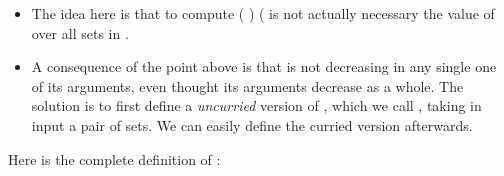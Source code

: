 \begin{itemize}
  \item The idea here is that to compute   (  ) (   is not actually necessary the value of  over all sets in .
  
  \TODO{}

  
  \item A consequence of the point above is that  is not decreasing in any single one of its arguments, even thought its arguments decrease as a whole. The solution is to first define a \emph{uncurried} version of , which we call , taking in input a pair of sets. We can easily define the curried version afterwards.
\end{itemize}

Here is the complete definition of :

